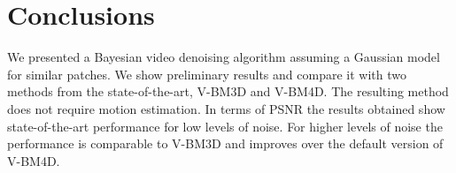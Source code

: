 \documentclass[10pt, journal, twocolumn, final, a4paper]{IEEEtran}
\begin{document}
\section{Conclusions}
\label{sec:conclusion}

We presented a Bayesian video denoising algorithm assuming a Gaussian model for similar patches. 
We show preliminary results and compare it with two methods from the
state-of-the-art, V-BM3D and V-BM4D.
The resulting method does not require motion estimation.%
In terms of PSNR
the results obtained show state-of-the-art performance for low levels of noise.
For higher levels of noise the performance is comparable to V-BM3D and improves
over the default version of V-BM4D.


%
%



\end{document}
